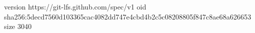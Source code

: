 version https://git-lfs.github.com/spec/v1
oid sha256:5decd7560d103365cac4082dd747e4cbd4b2c5c08208805f847c8ae68a626653
size 3040
